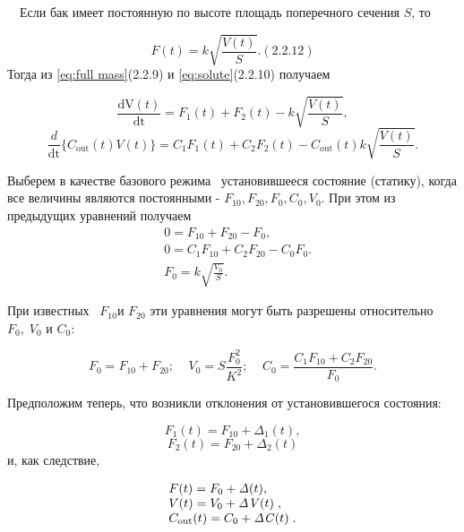 		\ \ Если бак имеет постоянную по высоте площадь поперечного сечения  $S$, то

\begin{equation}\label{eq:buck}
 F(t)=k\sqrt{\frac{V(t)} S}.  (2.2.12)
\end{equation}
		Тогда из \eqref{eq:full mass}(2.2.9) и \eqref{eq:solute}(2.2.10) получаем


\begin{equation*}
\frac{\text{dV}(t)}{\text{dt}}=F_1(t)+F_2(t)-k\sqrt{\frac{V(t)} S},
\end{equation*}
\begin{equation*}
\frac
d{\text{dt}}\{C_{\text{out}}(t)V(t)\}=C_1F_1(t)+C_2F_2(t)-C_{\text{out}}(t)k\sqrt{\frac{V(t)}
	S}.
\end{equation*}

		Выберем в качестве базового режима \ установившееся состояние (статику), когда все величины являются постоянными - 
		$F_{10},F_{20},F_0,C_0,V_0$. При этом из предыдущих уравнений получаем
\begin{align*}
		&0=F_{10}+F_{20}-F_0,\\
		&0=C_1F_{10}+C_2F_{20}-C_0F_0.\\
		&F_0=k\sqrt{\frac{V_0} S}.
\end{align*}



		При известных \  $F_{10}$и  $F_{20}$ эти уравнения могут быть разрешены относительно  $F_0,\;V_0$ и		$C_0$:
		
\begin{equation*}
		F_0=F_{10}+F_{20};\;\;\;\;V_0=S\frac{F_0^2}{K^2};\;\;\;\;C_0=\frac{C_1F_{10}+C_2F_{20}}{F_0}.
\end{equation*}



		Предположим теперь, что возникли отклонения от установившегося состояния:



\begin{equation*}
		 F_1(t)=F_{10}+\mathit{\Delta }_1(t),
\end{equation*}
\begin{equation*}
F_2(t)=F_{20}+\mathit{\Delta  }_2(t)
\end{equation*}
 и, как следствие,

\begin{equation*}
\begin{matrix}F(t)=F_0+\mathit{\Delta  }(t),\hfill\null \\V(t)=V_0+\mathit{\Delta V}(t)\;,\hfill\null
\\C_{\normalsubformula{\text{out}}}(t)=C_0+\mathit{\Delta C}(t)\;.\hfill\null \end{matrix}\hfill 
\end{equation*}


